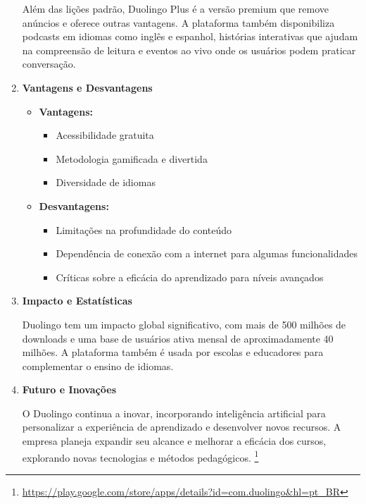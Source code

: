 \begin{enumerate}
    Além das lições padrão, Duolingo Plus é a versão premium que remove anúncios e oferece outras vantagens. A plataforma também disponibiliza podcasts em idiomas como inglês e espanhol, histórias interativas que ajudam na compreensão de leitura e eventos ao vivo onde os usuários podem praticar conversação.

    \item \textbf{Vantagens e Desvantagens}
    
    \begin{itemize}
        \item \textbf{Vantagens:}
        \begin{itemize}
            \item Acessibilidade gratuita
            \item Metodologia gamificada e divertida
            \item Diversidade de idiomas
        \end{itemize}

        \item \textbf{Desvantagens:}
        \begin{itemize}
            \item Limitações na profundidade do conteúdo
            \item Dependência de conexão com a internet para algumas funcionalidades
            \item Críticas sobre a eficácia do aprendizado para níveis avançados
        \end{itemize}
    \end{itemize}

    \item \textbf{Impacto e Estatísticas}
    
    Duolingo tem um impacto global significativo, com mais de 500 milhões de downloads e uma base de usuários ativa mensal de aproximadamente 40 milhões. A plataforma também é usada por escolas e educadores para complementar o ensino de idiomas.

    \item \textbf{Futuro e Inovações}
    
    O Duolingo continua a inovar, incorporando inteligência artificial para personalizar a experiência de aprendizado e desenvolver novos recursos. A empresa planeja expandir seu alcance e melhorar a eficácia dos cursos, explorando novas tecnologias e métodos pedagógicos.
    \footnote{\url{https://play.google.com/store/apps/details?id=com.duolingo&hl=pt_BR}}
\end{enumerate}
   


